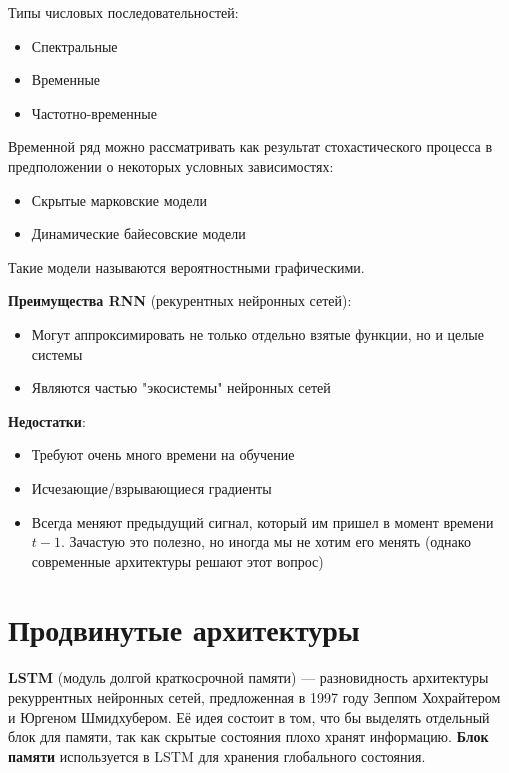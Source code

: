 Типы числовых последовательностей:
\begin{itemize}
    \item Спектральные
    \item Временные
    \item Частотно-временные
\end{itemize}

Временной ряд можно рассматривать как результат стохастического процесса в предположении о некоторых условных зависимостях:
\begin{itemize}
    \item Скрытые марковские модели
    \item Динамические байесовские модели
\end{itemize}

\begin{remark}
    Такие модели называются вероятностными графическими.
\end{remark}

\textbf{Преимущества RNN} (рекурентных нейронных сетей):
\begin{itemize}
    \item Могут аппроксимировать не только отдельно взятые функции, но и целые системы
    \item Являются частью "экосистемы" нейронных сетей
\end{itemize}

\textbf{Недостатки}:
\begin{itemize}
    \item Требуют очень много времени на обучение
    \item Исчезающие/взрывающиеся градиенты
    \item Всегда меняют предыдущий сигнал, который им пришел в момент времени $t-1$. Зачастую это полезно, но иногда мы не хотим его менять (однако современные архитектуры решают этот вопрос)
\end{itemize}

\section{Продвинутые архитектуры}

\begin{definition}
    \textbf{LSTM} (модуль долгой краткосрочной памяти) --- разновидность архитектуры рекуррентных нейронных сетей, предложенная в 1997 году Зеппом Хохрайтером и Юргеном Шмидхубером. Её идея состоит в том, что бы выделять отдельный блок для памяти, так как скрытые состояния плохо хранят информацию. \textbf{Блок памяти} используется в LSTM для хранения глобального состояния.
\end{definition}

